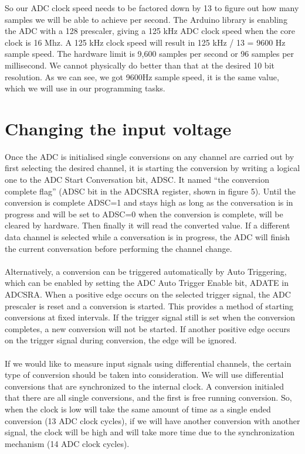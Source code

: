 \documentclass[english]{article}
\begin{document}
So our ADC clock speed needs to be factored down by 13 to figure out how many samples we will be able to achieve per second. The Arduino library is enabling the ADC with a 128 prescaler, giving a 125 kHz ADC clock speed when the core clock is 16 Mhz. A 125 kHz clock speed will result in 125 kHz / 13 = 9600 Hz sample speed. The hardware limit is 9,600 samples per second or 96 samples per millisecond. We cannot physically do better than that at the desired 10 bit resolution. As we can see, we got 9600Hz sample speed, it is the same value, which we will use in our programming tasks.
\section{Changing the input voltage}
Once the ADC is initialised single conversions on any channel are carried out by first selecting the desired channel, it is starting the conversion by writing a logical one to the ADC Start Conversation bit, ADSC. It named “the conversion complete flag” (ADSC bit in the ADCSRA register, shown in figure 5). Until the conversion is complete ADSC=1 and stays high as long as the conversation is in progress and will be set to ADSC=0 when the conversion is complete, will be cleared by hardware. Then finally it will read the converted value. If a different data channel is selected while a conversation is in progress, the ADC will finish the current conversation before performing the channel change.\\\\
Alternatively, a conversion can be triggered automatically by Auto Triggering, which can be enabled by setting the ADC Auto Trigger Enable bit, ADATE in ADCSRA. When a positive edge occurs on the selected trigger signal, the ADC prescaler is reset and a conversion is started. This provides a method of starting conversions at fixed intervals. If the trigger signal still is set when the conversion completes, a new conversion will not be started. If another positive edge occurs on the trigger signal during conversion, the edge will be ignored.\\\\
If we would like to measure input signals using differential channels, the certain type of conversion should be taken into consideration. We will use differential conversions that are synchronized to the internal clock. A conversion initialed that there are all single conversions, and the first is free running conversion. So, when the clock is low will take the same amount of time as a single ended conversion (13 ADC clock cycles), if we will have another conversion with another signal, the clock will be high and will take more time due to the synchronization mechanism (14 ADC clock cycles).
\end{document}

